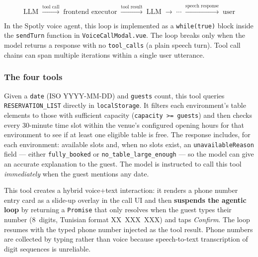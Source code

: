 \documentclass[12pt,a4paper,oneside]{report}
\begin{document}
\[
\text{LLM} \;\xrightarrow{\text{tool call}}\; \text{frontend executor}
\;\xrightarrow{\text{tool result}}\; \text{LLM} \;\to\; \cdots
\;\xrightarrow{\text{speech response}}\; \text{user}
\]

In the Spotly voice agent, this loop is implemented as a \texttt{while(true)}
block inside the \texttt{sendTurn} function in
\texttt{VoiceCallModal.vue}. The loop breaks only when the model returns a
response with no \texttt{tool\_calls} (a plain speech turn). Tool call
chains can span multiple iterations within a single user utterance.

\subsubsection{The four tools}

\begin{description}[leftmargin=2em, topsep=4pt, itemsep=6pt,
                    font=\bfseries\ttfamily]
  \item[check\_availability]
    Given a \texttt{date} (ISO YYYY-MM-DD) and \texttt{guests} count, this
    tool queries \texttt{RESERVATION\_LIST} directly in \texttt{localStorage}.
    It filters each environment's table elements to those with sufficient
    capacity (\texttt{capacity >= guests}) and then checks every 30-minute
    time slot within the venue's configured opening hours for that environment
    to see if at least one eligible table is free. The response includes, for
    each environment: available slots and, when no slots exist, an
    \texttt{unavailableReason} field --- either \texttt{fully\_booked} or
    \texttt{no\_table\_large\_enough} --- so the model can give an accurate
    explanation to the guest. The model is instructed to call this tool
    \emph{immediately} when the guest mentions any date.

  \item[request\_text\_input]
    This tool creates a hybrid voice+text interaction: it renders a phone
    number entry card as a slide-up overlay in the call UI and then
    \textbf{suspends the agentic loop} by returning a \texttt{Promise} that
    only resolves when the guest types their number (8~digits, Tunisian
    format XX~XXX~XXX) and taps \emph{Confirm}. The loop resumes with the
    typed phone number injected as the tool result. Phone numbers are
    collected by typing rather than voice because speech-to-text transcription
    of digit sequences is unreliable.


\end{description}
\end{document}
